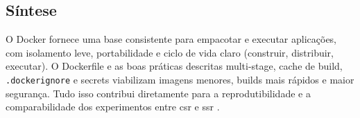 \subsection{Síntese}
\label{sec:docker-sintese}

O Docker fornece uma base consistente para empacotar e executar aplicações, com isolamento leve, portabilidade e ciclo de vida claro (construir, distribuir, executar). O Dockerfile e as boas práticas descritas multi-stage, cache de build, \texttt{.dockerignore} e secrets viabilizam imagens menores, builds mais rápidos e maior segurança. Tudo isso contribui diretamente para a reprodutibilidade e a comparabilidade dos experimentos entre \acrshort{csr} e \acrshort{ssr} \cite{docker_overview,dockerfile_ref}.
